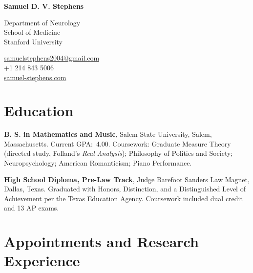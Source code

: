 \documentclass[11pt,letterpaper]{report} %
\newcommand{\myname}{Samuel D. V. Stephens}
\newcommand{\namefont}[1]{{\normalfont\bfseries\Huge{#1}}}
\newcommand{\forthcoming}{\textit{Forthcoming.}}
\begin{document}
    \raggedright{}


    \namefont{\myname}

    \vspace{1em}
    \begin{minipage}[t]{0.700\textwidth}
        Department of Neurology \\
        School of Medicine \\
        Stanford University
    \end{minipage}
    \begin{minipage}[t]{0.295\textwidth}
        \raggedleft{}
        \href{mailto:samuelstephens2004@gmail.com}{samuelstephens2004@gmail.com} \\
        +1 214 843 5006 \\
        \href{https://www.samuel-stephens.com}{samuel-stephens.com}
    \end{minipage}

    \section*{Education}
    \begin{tablist}
        \item[2026--] \tab{}\textbf{B. S. in Mathematics and Music}, Salem State University, Salem, Massachusetts. Current GPA:~4.00. Coursework: Graduate Measure Theory (directed study, Folland's \textit{Real Analysis}); Philosophy of Politics and Society; Neuropsychology; American Romanticism; Piano Performance.
        \item[2019--22] \tab{}\textbf{High School Diploma, Pre-Law Track}, Judge Barefoot Sanders Law Magnet, Dallas, Texas. Graduated with Honors, Distinction, and a Distinguished Level of Achievement per the Texas Education Agency. Coursework included dual credit and 13 AP exams.
    \end{tablist}

    \section*{Appointments and Research Experience}
\end{document}
